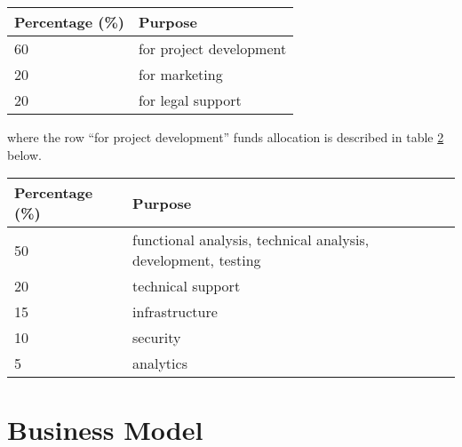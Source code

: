 \documentclass[11pt,fleqn]{book} %
\begin{document}
\vspace{5mm}
\begin{table}[H]
	\centering
	\begin{tabular}{l l}
		\toprule
		\textbf{Percentage (\%)} & \textbf{Purpose} \\
		\midrule
		60		& for project development	\\
		20		& for marketing	\\
		20		& for legal support	\\
		\bottomrule
	\end{tabular}
	\label{tab:division}
\end{table}

\vspace{5mm}
where the row ``for project development'' funds allocation is described in table \ref{tab:focus} below.

\vspace{5mm}
\begin{table}[H]
	\centering
	\begin{tabular}{l l}
		\toprule
		\textbf{Percentage (\%)} & \textbf{Purpose} \\
		\midrule
		50		& functional analysis, technical analysis, development, testing	\\
		20		& technical support	\\
		15		& infrastructure	\\
		10		& security	\\
		5		& analytics	\\
		\bottomrule
	\end{tabular}
	\label{tab:focus}
\end{table}



\chapter{Business Model}
\end{document}
